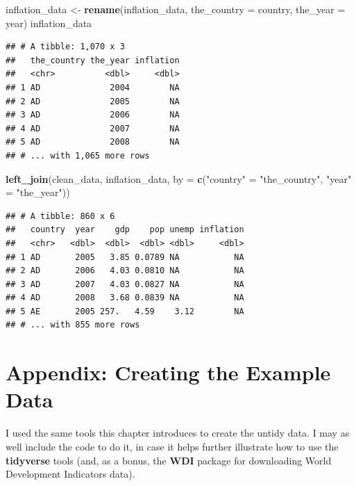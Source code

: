 \documentclass[
  12pt,
  oneside,openany]{book}
\newenvironment{Shaded}{\begin{snugshade}}{\end{snugshade}}
\newcommand{\DataTypeTok}[1]{\textcolor[rgb]{0.13,0.29,0.53}{#1}}
\newcommand{\KeywordTok}[1]{\textcolor[rgb]{0.13,0.29,0.53}{\textbf{#1}}}
\newcommand{\NormalTok}[1]{#1}
\newcommand{\StringTok}[1]{\textcolor[rgb]{0.31,0.60,0.02}{#1}}
\begin{document}
\begin{Shaded}
\begin{Highlighting}[]
\NormalTok{inflation\_data <{-}}\StringTok{ }\KeywordTok{rename}\NormalTok{(inflation\_data,}
                         \DataTypeTok{the\_country =}\NormalTok{ country,}
                         \DataTypeTok{the\_year =}\NormalTok{ year)}
\NormalTok{inflation\_data}
\end{Highlighting}
\end{Shaded}

\begin{verbatim}
## # A tibble: 1,070 x 3
##   the_country the_year inflation
##   <chr>          <dbl>     <dbl>
## 1 AD              2004        NA
## 2 AD              2005        NA
## 3 AD              2006        NA
## 4 AD              2007        NA
## 5 AD              2008        NA
## # ... with 1,065 more rows
\end{verbatim}

\begin{Shaded}
\begin{Highlighting}[]
\KeywordTok{left\_join}\NormalTok{(clean\_data,}
\NormalTok{          inflation\_data,}
          \DataTypeTok{by =} \KeywordTok{c}\NormalTok{(}\StringTok{"country"}\NormalTok{ =}\StringTok{ "the\_country"}\NormalTok{, }\StringTok{"year"}\NormalTok{ =}\StringTok{ "the\_year"}\NormalTok{))}
\end{Highlighting}
\end{Shaded}

\begin{verbatim}
## # A tibble: 860 x 6
##   country  year    gdp    pop unemp inflation
##   <chr>   <dbl>  <dbl>  <dbl> <dbl>     <dbl>
## 1 AD       2005   3.85 0.0789 NA           NA
## 2 AD       2006   4.03 0.0810 NA           NA
## 3 AD       2007   4.03 0.0827 NA           NA
## 4 AD       2008   3.68 0.0839 NA           NA
## 5 AE       2005 257.   4.59    3.12        NA
## # ... with 855 more rows
\end{verbatim}

\hypertarget{appendix-creating-the-example-data}{%
\section{Appendix: Creating the Example Data}\label{appendix-creating-the-example-data}}

I used the same tools this chapter introduces to create the untidy data. I may as well include the code to do it, in case it helps further illustrate how to use the \textbf{tidyverse} tools (and, as a bonus, the \textbf{WDI} package for downloading World Development Indicators data).
\end{document}
